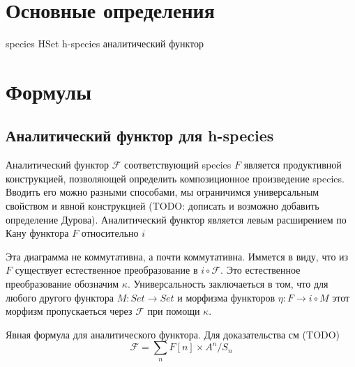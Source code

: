 \section{Основные определения}

species
HSet
h-species
аналитический функтор

\section{Формулы}

\subsection{Аналитический функтор для h-species}
Аналитический функтор $\mathcal F$ соответствующий species $F$ является
продуктивной конструкцией, позволяющей определить композиционное произведение
species. Вводить его можно разными способами, мы ограничимся универсальным
свойством и явной конструкцией (TODO: дописать и возможно добавить определение
Дурова). Аналитический функтор является левым расширением по Кану функтора $F$
относительно $i$


Эта диаграмма не коммутативна, а почти коммутативна. Иммется в виду, что из
$F$ существует естественное преобразование в $i \circ \mathcal F$.
Это естественное преобразование обозначим $\kappa$.
Универсальность заключаеться в том, что для любого другого функтора $M \colon
Set \rightarrow Set$ и морфизма функторов $\eta \colon F \rightarrow i \circ M$
этот морфизм пропускаеться через $\mathcal F$ при помощи $\kappa$.



Явная формула для аналитического функтора. Для доказательства см (TODO)
\begin{equation}
\label{eq:an}
	\mathcal F = \sum\limits_n F[n] \times A^n / S_n
\end{equation}

